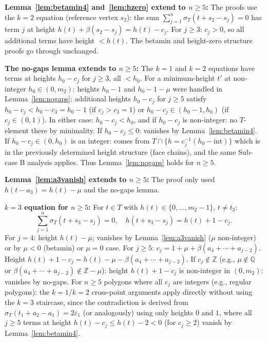 \documentclass{article}
\begin{document}
\textbf{Lemma~\ref{lem:betamin4} and~\ref{lem:hzero} extend to $n\ge 5$:}
The proofs use the $k=2$ equation (reference vertex $s_2$): the sum $\sum_{j=1}^n\sigma_T(t+s_2-s_j)=0$ has term $j$ at height $h(t)+\beta(s_2-s_j)=h(t)-c_j$.  For $j\ge 3$: $c_j>0$, so all additional terms have height $<h(t)$.  The betamin and height-zero structure proofs go through unchanged.

\textbf{The no-gaps lemma extends to $n\ge 5$:}
The $k=1$ and $k=2$ equations have terms at heights $h_0-c_j$ for $j\ge 3$, all $<h_0$.
For a minimum-height $t'$ at non-integer $h_0\in(0,m_2)$:
heights $h_0-1$ and $h_0-1-\mu$ were handled in Lemma~\ref{lem:nogaps};
additional heights $h_0-c_j$ for $j\ge 5$ satisfy $h_0-c_j<h_0-c_3=h_0-1$ (if $c_j>c_3=1$)
or $h_0-c_j\in(h_0-1,h_0)$ (if $c_j\in(0,1)$).
In either case: $h_0-c_j<h_0$, and if $h_0-c_j$ is non-integer: no $T$-element there by minimality.
If $h_0-c_j\le 0$: vanishes by Lemma~\ref{lem:betamin4}.
If $h_0-c_j\in(0,h_0)$ is an integer: comes from $T\cap\{h=c_j^{-1}(h_0-\text{int})\}$ which is in the
previously determined height structure (face chains), and the same Sub-case B analysis applies.
Thus Lemma~\ref{lem:nogaps} holds for $n\ge 5$.

\textbf{Lemma~\ref{lem:a3vanish} extends to $n\ge 5$:}
The proof only used $h(t-a_3)=h(t)-\mu$ and the no-gaps lemma.

\textbf{$k=3$ equation for $n\ge 5$:}
For $t\in T$ with $h(t)\in\{0,\dots,m_2-1\}$, $t\ne t_3$:
\[
  \sum_{j=1}^n\sigma_T(t+s_3-s_j)=0,\quad h(t+s_3-s_j)=h(t)+1-c_j.
\]
For $j=4$: height $h(t)-\mu$; vanishes by Lemma~\ref{lem:a3vanish} ($\mu$ non-integer) or by $\mu<0$ (betamin) or $\mu=0$ case.
For $j\ge 5$: $c_j=1+\mu+\beta(a_4+\cdots+a_{j-2})$.  Height $h(t)+1-c_j=h(t)-\mu-\beta(a_4+\cdots+a_{j-2})$.
If $c_j\notin\mathbb{Z}$ (e.g., $\mu\notin\mathbb{Q}$ or $\beta(a_4+\cdots+a_{j-2})\notin\mathbb{Z}-\mu$):
height $h(t)+1-c_j$ is non-integer in $(0,m_2)$: vanishes by no-gaps.
For $n\ge 5$ polygons where all $c_j$ are integers (e.g., regular polygons): the $k=1$/$k=2$
cross-point arguments apply directly without using the $k=3$ staircase, since the contradiction
is derived from $\sigma_T(t_1+a_2-a_1)=2\varepsilon_1$ (or analogously) using only heights $0$ and $1$,
where all $j\ge 5$ terms at height $h(t)-c_j\le h(t)-2<0$ (for $c_j\ge 2$) vanish by Lemma~\ref{lem:betamin4}.
\end{document}
